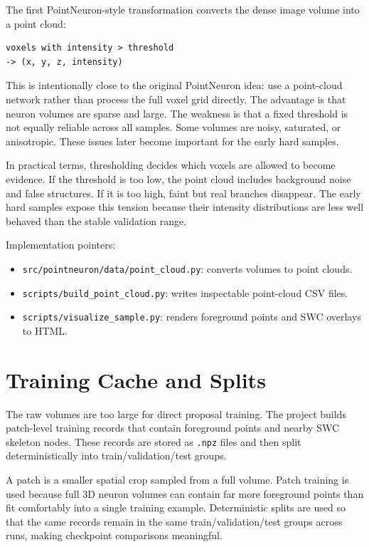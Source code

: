\documentclass[11pt]{article}
\begin{document}
The first PointNeuron-style transformation converts the dense image volume into
a point cloud:

\begin{lstlisting}
voxels with intensity > threshold
-> (x, y, z, intensity)
\end{lstlisting}

This is intentionally close to the original PointNeuron idea: use a point-cloud
network rather than process the full voxel grid directly. The advantage is that
neuron volumes are sparse and large. The weakness is that a fixed threshold is
not equally reliable across all samples. Some volumes are noisy, saturated, or
anisotropic. These issues later become important for the early hard samples.

In practical terms, thresholding decides which voxels are allowed to become
evidence. If the threshold is too low, the point cloud includes background noise
and false structures. If it is too high, faint but real branches disappear. The
early hard samples expose this tension because their intensity distributions are
less well behaved than the stable validation range.

Implementation pointers:

\begin{itemize}
  \item \texttt{src/pointneuron/data/point\_cloud.py}: converts volumes to
  point clouds.
  \item \texttt{scripts/build\_point\_cloud.py}: writes inspectable point-cloud
  CSV files.
  \item \texttt{scripts/visualize\_sample.py}: renders foreground points and
  SWC overlays to HTML.
\end{itemize}

\section{Training Cache and Splits}

The raw volumes are too large for direct proposal training. The project builds
patch-level training records that contain foreground points and nearby SWC
skeleton nodes. These records are stored as \texttt{.npz} files and then split
deterministically into train/validation/test groups.

A patch is a smaller spatial crop sampled from a full volume. Patch training is
used because full 3D neuron volumes can contain far more foreground points than
fit comfortably into a single training example. Deterministic splits are used
so that the same records remain in the same train/validation/test groups across
runs, making checkpoint comparisons meaningful.
\end{document}
